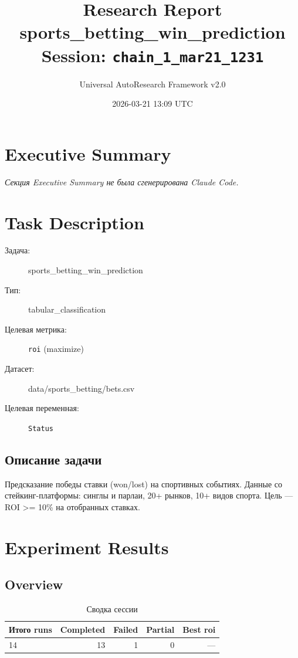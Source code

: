 \documentclass[12pt,a4paper]{article}
\title{
    \Large\textbf{Research Report}\\[0.5em]
    \large sports\_betting\_win\_prediction\\[0.3em]
    \normalsize Session: \texttt{chain\_1\_mar21\_1231}
}
\author{Universal AutoResearch Framework v2.0}
\date{2026-03-21 13:09 UTC}
\begin{document}
\maketitle
\tableofcontents
\newpage


\section{Executive Summary}

\textit{Секция Executive Summary не была сгенерирована Claude Code.}



\section{Task Description}

\begin{description}
    \item[Задача:] sports\_betting\_win\_prediction
    \item[Тип:] tabular\_classification
    \item[Целевая метрика:] \texttt{roi}
        (maximize)
    \item[Датасет:] data/sports\_betting/bets.csv
    \item[Целевая переменная:] \texttt{Status}
\end{description}

\subsection*{Описание задачи}
Предсказание победы ставки (won/lost) на спортивных событиях. Данные со стейкинг-платформы: синглы и парлаи, 20+ рынков, 10+ видов спорта. Цель — ROI >= 10\% на отобранных ставках.




\section{Experiment Results}

\subsection{Overview}

\begin{table}[H]
\centering
\caption{Сводка сессии}
\begin{tabular}{lrrrr}
\toprule
Итого runs & Completed & Failed & Partial & Best roi \\
\midrule
14 & \textcolor{passcolor}{13}
    & \textcolor{failcolor}{1}
    & \textcolor{partialcolor}{0}
    & --- \\
\bottomrule
\end{tabular}
\end{table}
\end{document}
